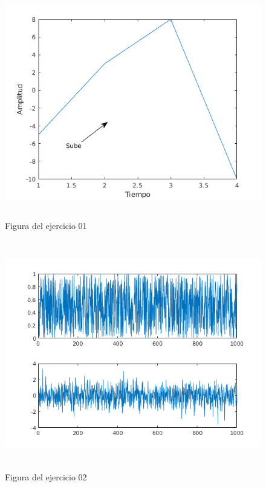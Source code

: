 \documentclass[a4paper,11pt]{article}                 %
\begin{document}
  \begin{figure}[H]
    \begin{center}
      \includegraphics[height=10cm]{ejercicio01.png}
      \caption{Figura del ejercicio 01}
      \label{fig:01}
    \end{center}
  \end{figure}

  \begin{figure}[H]
    \begin{center}
      \includegraphics[height=10cm]{ejercicio02.png}
      \caption{Figura del ejercicio 02}
      \label{fig:02}
    \end{center}
  \end{figure}
  
  
\end{document}
